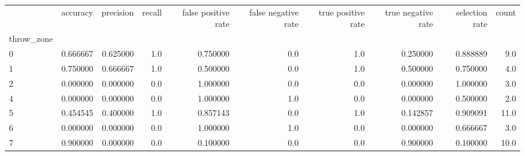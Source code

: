 \begin{tabular}{lrrrrrrrrr}
\toprule
{} &  accuracy &  precision &  recall &  false positive rate &  false negative rate &  true positive rate &  true negative rate &  selection rate &  count \\
throw\_zone &           &            &         &                      &                      &                     &                     &                 &        \\
\midrule
0          &  0.666667 &   0.625000 &     1.0 &             0.750000 &                  0.0 &                 1.0 &            0.250000 &        0.888889 &    9.0 \\
1          &  0.750000 &   0.666667 &     1.0 &             0.500000 &                  0.0 &                 1.0 &            0.500000 &        0.750000 &    4.0 \\
2          &  0.000000 &   0.000000 &     0.0 &             1.000000 &                  0.0 &                 0.0 &            0.000000 &        1.000000 &    3.0 \\
4          &  0.000000 &   0.000000 &     0.0 &             1.000000 &                  1.0 &                 0.0 &            0.000000 &        0.500000 &    2.0 \\
5          &  0.454545 &   0.400000 &     1.0 &             0.857143 &                  0.0 &                 1.0 &            0.142857 &        0.909091 &   11.0 \\
6          &  0.000000 &   0.000000 &     0.0 &             1.000000 &                  1.0 &                 0.0 &            0.000000 &        0.666667 &    3.0 \\
7          &  0.900000 &   0.000000 &     0.0 &             0.100000 &                  0.0 &                 0.0 &            0.900000 &        0.100000 &   10.0 \\
\bottomrule
\end{tabular}
